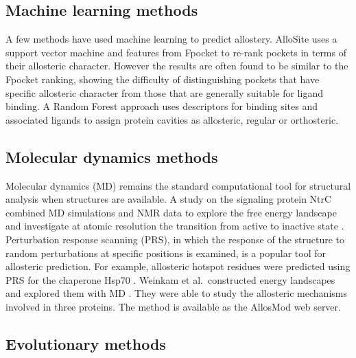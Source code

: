 \subsection{Machine learning methods}

A few methods have used machine learning to predict allostery.
AlloSite \cite{Huang2013} uses a support vector machine and features from Fpocket \cite{LeGuilloux2009} to re-rank pockets in terms of their allosteric character.
However the results are often found to be similar to the Fpocket ranking, showing the difficulty of distinguishing pockets that have specific allosteric character from those that are generally suitable for ligand binding.
A Random Forest approach \cite{Chen2016} uses descriptors for binding sites and associated ligands to assign protein cavities as allosteric, regular or orthosteric.

\subsection{Molecular dynamics methods}

Molecular dynamics (MD) remains the standard computational tool for structural analysis when structures are available.
A study on the signaling protein NtrC combined MD simulations and NMR data to explore the free energy landscape and investigate at atomic resolution the transition from active to inactive state \cite{Pontiggia2015}.
Perturbation response scanning (PRS), in which the response of the structure to random perturbations at specific positions is examined, is a popular tool for allosteric prediction.
For example, allosteric hotspot residues were predicted using PRS for the chaperone Hsp70 \cite{Penkler2017}.
Weinkam et al.\ constructed energy landscapes and explored them with MD \cite{Weinkam2012}.
They were able to study the allosteric mechanisms involved in three proteins.
The method is available as the AllosMod web server.

\subsection{Evolutionary methods}

